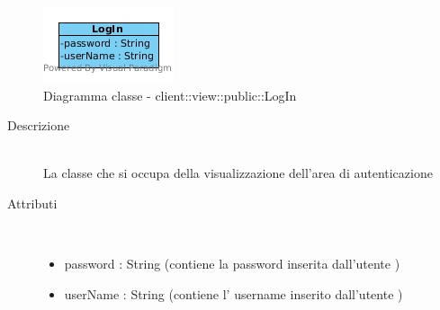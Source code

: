 \begin{center}
			\begin{figure}[H]
				\centering \includegraphics[scale=4, max width=\textwidth, max height=\myheight]{../img/diagrammiClassi/client/view/public/LogIn.png}
				\caption{Diagramma classe - client::view::public::LogIn}
			\end{figure}
		\end{center}\begin{description}
\item[Descrizione] \hfill \\
 La classe che si occupa della visualizzazione dell'area di autenticazione
\item[Attributi] \hfill \\
 \vspace{-7mm}
\begin{itemize}
\item password : String (contiene la password inserita dall'utente )
\item userName : String (contiene l' username inserito dall'utente )
\end{itemize}

\end{description}

